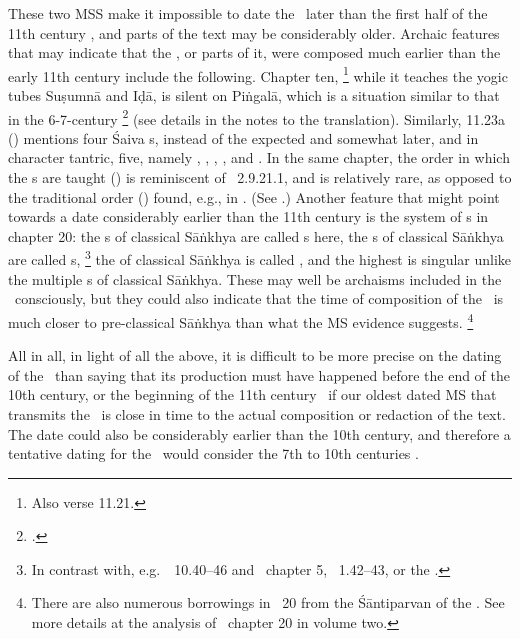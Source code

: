 These two MSS make it impossible to date the \VSS\ later 
than the first half of the 11th century \CE, and parts of the text
may be considerably older.
Archaic features that may indicate 
that the \VSS, or parts of it, were
composed much earlier than the early 11th century
include the following. Chapter ten,%
		\footnote{Also verse 11.21.} 
while it teaches the yogic tubes
 Suṣumnā and Iḍā, is silent on Piṅgalā, 
which is a situation similar to that in 
the 6-7-century \NisvNaya%
	\footnote{.}  
(see details in the notes to the translation).
Similarly, 11.23a () mentions four
Śaiva s, instead of the expected and 
somewhat later, and in character tantric, five, namely
, , , 
, and . In the same chapter,
the order in which the s are taught
() 
is reminiscent of \Apastambadharmasutra\ 2.9.21.1,
and is relatively rare,
as opposed to the traditional order () found, e.g., in
\MANU. (See .)
Another feature that might point towards a date
considerably earlier than the 11th century is the 
system of s in chapter 20:
the s of classical Sāṅkhya are called 
s here, the s of
classical Sāṅkhya are called s,%
		\footnote{In contrast with, e.g.\ \SDHU\ 10.40--46 and
					\UUMS\ chapter 5, \DHARMP\ 1.42--43, or the \SIVAUP.}
the  of classical Sāṅkhya
is called , and the highest  
is singular unlike the multiple s of classical 
Sāṅkhya. These may well be archaisms 
included in the \VSS\ consciously, but they could also
indicate that the time of composition of the \VSS\
is much closer to pre-classical Sāṅkhya than what the MS
evidence suggests.%
	\footnote{There are also numerous borrowings in \VSS\ 20
					from the Śāntiparvan of the \MBH. See more details
					at the analysis of \VSS\ chapter 20 in volume two.}

All in all, in light of all the above,
it is difficult to be more precise on the dating
of the \VSS\ than saying that its production must have
happened before the end of the 10th century, or the beginning
of the 11th century \CE\ if our oldest dated MS that transmits
the \VSS\ is close in time to the actual composition or
redaction of the text. The date could also be considerably
earlier than the 10th century, and therefore a tentative dating
for the \VSS\ would consider the 7th to 10th centuries \CE.




